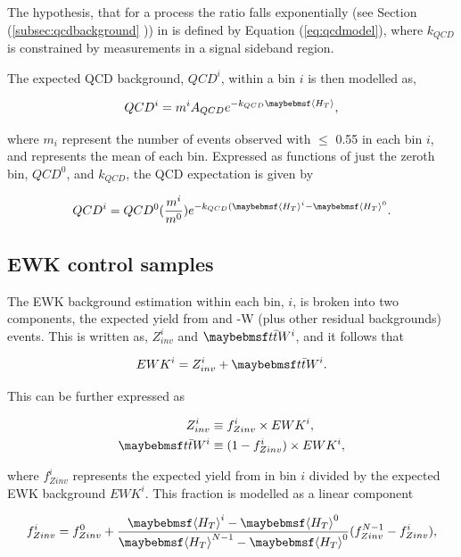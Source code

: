 The hypothesis, that for a process the \alphat ratio falls exponentially (see Section (\ref{subsec:qcdbackground} )) in \theht is defined by Equation (\ref{eq:qcdmodel}), where $k_{QCD}$ is constrained by measurements in a signal sideband region. 

The expected QCD background, $QCD^{i}$, within a bin $i$ is then modelled as,

\begin{equation}
QCD^{i} = m^{i}A_{QCD}e^{-k_{QCD}\meanht},
\end{equation}

where $m_{i}$ represent the number of events observed with \alphat $\leq$ 0.55 in each \theht bin $i$, and \meanht represents the mean \theht of each bin. Expressed as functions of just the zeroth bin, $QCD^{0}$, and $k_{QCD}$, the QCD expectation is given by

\begin{equation}
QCD^{i} = QCD^{0}(\frac{m^{i}}{m^{0}})e^{-k_{QCD}(\meanht^{i}-\meanht^{0}}.
\end{equation} 

\subsection{\ac{EWK} control samples}
\label{subsec:ewkmodel}

The \ac{EWK} background estimation within each bin, $i$, is broken into two components, the expected yield from \zinv and \ttbar-W (plus other residual backgrounds) events. This is written as, $Z^{i}_{inv}$ and $\ttbar W^{i}$, and it follows that 

\begin{equation}
EWK^{i} = Z^{i}_{inv} + \ttbar W^{i}.
\end{equation}

This can be further expressed as

\begin{align}
\label{eq:zinvcontribution}
Z^{i}_{inv} &\equiv f^{i}_{Zinv} \times EWK^{i}, \\
\label{eq:ttwcontribution}
\ttbar W^{i} &\equiv (1 - f^{i}_{Zinv}) \times EWK^{i},
\end{align}

where $f^{i}_{Zinv}$ represents the expected yield from \zinv in bin $i$ divided by the expected \ac{EWK} background $EWK^{i}$. This fraction is modelled as a linear component

\begin{equation}
f^{i}_{Zinv} = f^{0}_{Zinv} + \frac{\meanht^{i}-\meanht^{0}}{\meanht^{N-1}-\meanht^{0}}(f^{N-1}_{Zinv} - f^{i}_{Zinv}),
\end{equation}

